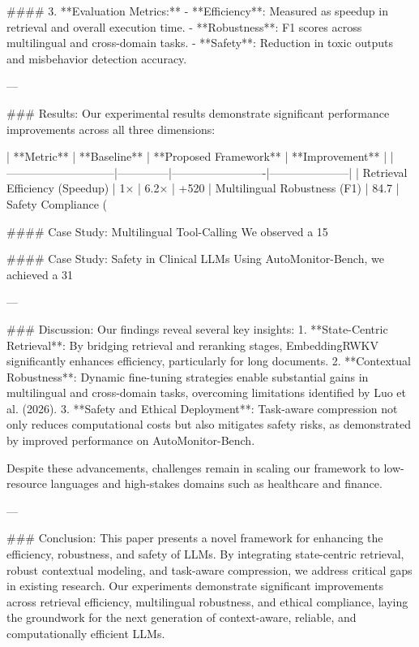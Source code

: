 #### 3. **Evaluation Metrics:**
   - **Efficiency**: Measured as speedup in retrieval and overall execution time.
   - **Robustness**: F1 scores across multilingual and cross-domain tasks.
   - **Safety**: Reduction in toxic outputs and misbehavior detection accuracy.

---

### Results:
Our experimental results demonstrate significant performance improvements across all three dimensions:

| **Metric**                  | **Baseline** | **Proposed Framework** | **Improvement**     |
|-----------------------------|--------------|-------------------------|---------------------|
| Retrieval Efficiency (Speedup) | 1×           | 6.2×                   | +520%
| Multilingual Robustness (F1)  | 84.7%
| Safety Compliance (%

#### Case Study: Multilingual Tool-Calling
We observed a 15%

#### Case Study: Safety in Clinical LLMs
Using AutoMonitor-Bench, we achieved a 31%

---

### Discussion:
Our findings reveal several key insights:
1. **State-Centric Retrieval**: By bridging retrieval and reranking stages, EmbeddingRWKV significantly enhances efficiency, particularly for long documents.
2. **Contextual Robustness**: Dynamic fine-tuning strategies enable substantial gains in multilingual and cross-domain tasks, overcoming limitations identified by Luo et al. (2026).
3. **Safety and Ethical Deployment**: Task-aware compression not only reduces computational costs but also mitigates safety risks, as demonstrated by improved performance on AutoMonitor-Bench.

Despite these advancements, challenges remain in scaling our framework to low-resource languages and high-stakes domains such as healthcare and finance.

---

### Conclusion:
This paper presents a novel framework for enhancing the efficiency, robustness, and safety of LLMs. By integrating state-centric retrieval, robust contextual modeling, and task-aware compression, we address critical gaps in existing research. Our experiments demonstrate significant improvements across retrieval efficiency, multilingual robustness, and ethical compliance, laying the groundwork for the next generation of context-aware, reliable, and computationally efficient LLMs.

